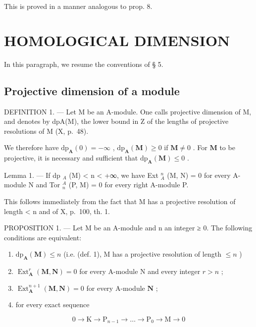 This is proved in a manner analogous to prop. 8.

\section{HOMOLOGICAL DIMENSION}

In this paragraph, we resume the conventions of § 5.

\subsection{Projective dimension of a module}

DEFINITION 1. --- Let M be an A-module. One calls projective dimension of M, and denotes by dpA(M), the lower bound in Z of the lengths of projective resolutions of M (X, p.~48).

We therefore have \(\mathrm{dp}_{\mathbf{A}}(0) = -\infty\) , \(\mathrm{dp}_{\mathbf{A}}(\mathbf{M}) \geqslant 0\) if \(\mathbf{M} \neq 0\) . For \(\mathbf{M}\) to be projective, it is necessary and sufficient that \(\mathrm{dp}_{\mathbf{A}}(\mathbf{M}) \leqslant 0\) .

Lemma 1. --- If dp \(_{A}\) (M) \textless{} n \textless{} +∞, we have Ext \(_{A}^{n}\) (M, N) = 0 for every A-module N and Tor \(_{n}^{A}\) (P, M) = 0 for every right A-module P.

This follows immediately from the fact that M has a projective resolution of length \textless{} n and of X, p.~100, th. 1.

PROPOSITION 1. --- Let M be an A-module and n an integer ≥ 0. The following conditions are equivalent:

\begin{enumerate}
\def\labelenumi{(\roman{enumi})}
\item
  \(\mathrm{dp}_{\mathbf{A}}(\mathbf{M}) \leqslant n\) (i.e. (def. 1), M has a projective resolution of length \(\leqslant n\) )
\item
  \(\operatorname{Ext}_{\mathbf{A}}^{r}(\mathbf{M},\mathbf{N}) = 0\) for every A-module N and every integer \(r > n\) ;
\item
  \(\operatorname{Ext}_{\mathbf{A}}^{n+1}(\mathbf{M}, \mathbf{N}) = 0\) for every A-module \(\mathbf{N}\) ;
\item
  for every exact sequence
\end{enumerate}

\[
0 \rightarrow \mathrm{K} \rightarrow \mathrm{P} _ {n - 1} \rightarrow \dots \rightarrow \mathrm{P} _ {0} \rightarrow \mathrm{M} \rightarrow 0
\]

